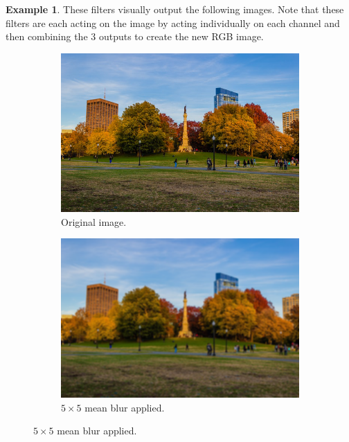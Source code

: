 \documentclass{article}
\theoremstyle{definition}
\newtheorem{example}{Example}[section]
\theoremstyle{remark}
\theoremstyle{definition}
\begin{document}
\begin{example}
    These filters visually output the following images. Note that these filters are each acting on the image by acting individually on each channel and then combining the 3 outputs to create the new RGB image. 
    \begin{figure}[hbt!]
        \centering
        \begin{subfigure}[b]{0.32\textwidth}
        \centering
            \includegraphics[width=\textwidth]{Images/OpenCV/Park_Full.png}
            \caption{Original image. }
            \label{fig:original_image}
        \end{subfigure}
        \begin{subfigure}[b]{0.32\textwidth}
        \centering
            \includegraphics[width=\textwidth]{Images/OpenCV/Mean_Blur.png}
            \caption{$5 \times 5$ mean blur applied. }
            \label{fig:mean_blur_image}
        \end{subfigure}

\end{figure}
\end{example}
\end{document}
